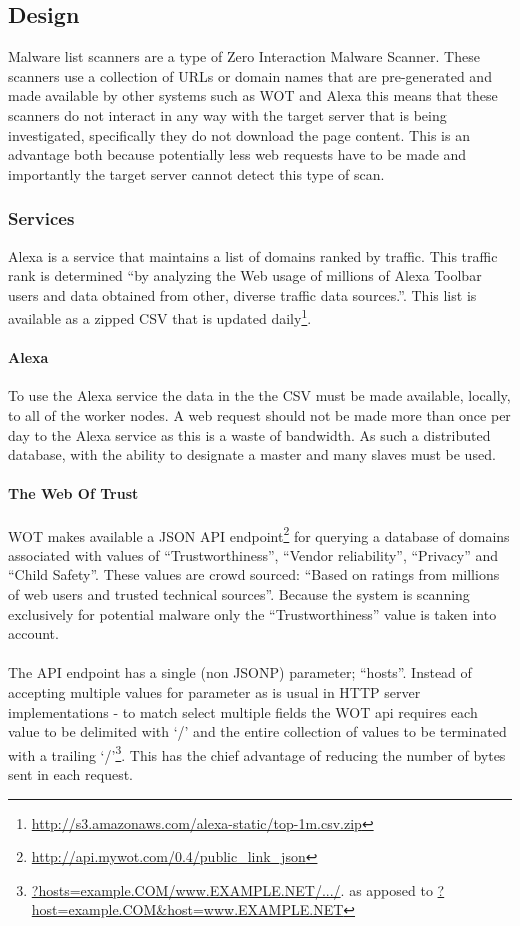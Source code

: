 \subsection{Design}
Malware list scanners are a type of Zero Interaction Malware Scanner.  These scanners use a collection of URLs or domain names that are pre-generated and made available by other systems such as WOT and Alexa this means that these scanners do not interact in any way with the target server that is being investigated, specifically they do not download the page content. This is an advantage both because potentially less web requests have to be made and importantly the target server cannot detect this type of scan.

\subsubsection{Services}
Alexa is a service that maintains a list of domains ranked by traffic. This traffic rank is determined ``by analyzing the Web usage of millions of Alexa Toolbar users and data obtained from other, diverse traffic data sources.''\cite{alexa-about}. This list is available as a zipped CSV that is updated daily\footnote{\url{http://s3.amazonaws.com/alexa-static/top-1m.csv.zip}}.

\paragraph{Alexa}
To use the Alexa service the data in the the CSV must be made available, locally, to all of the worker nodes. A web request should not be made more than once per day to the Alexa service as this is a waste of bandwidth. As such a distributed database, with the ability to designate a master and many slaves must be used.

\paragraph{The Web Of Trust}
WOT makes available a JSON API endpoint\footnote{\url{http://api.mywot.com/0.4/public_link_json}} for querying a database of domains associated with values of ``Trustworthiness'', ``Vendor reliability'', ``Privacy'' and ``Child Safety''. These values are crowd sourced: ``Based on ratings from millions of web users and trusted technical sources''\cite{wot-about}. Because the system is scanning exclusively for potential malware only the ``Trustworthiness'' value is taken into account.

\paragraph{}
The API endpoint has a single (non JSONP) parameter; ``hosts''. Instead of accepting multiple values for parameter as is usual in HTTP server implementations - to match select multiple fields the WOT api requires each value to be delimited with `/' and the entire collection of values to be terminated with a trailing `/'\footnote{\url{?hosts=example.COM/www.EXAMPLE.NET/.../}. as apposed to \url{?host=example.COM&host=www.EXAMPLE.NET}}.  This has the chief advantage of reducing the number of bytes sent in each request.


